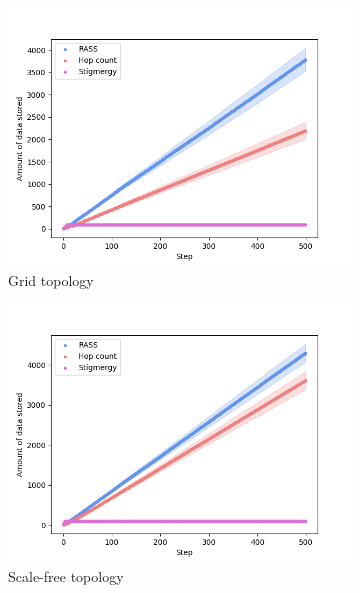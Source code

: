 \begin{figure}
    \centering
    \begin{subfigure}{0.48\textwidth}
        \includegraphics[width=\textwidth]{figures/dora_mesh/grid_storage.png}
        \caption{Grid topology}
        \label{results:grid_100_storage}
    \end{subfigure}
    \begin{subfigure}{0.48\textwidth}
        \includegraphics[width=\textwidth]{figures/dora_mesh/scale_storage.png}
        \caption{Scale-free topology}
        \label{results:scale_100_storage}
    \end{subfigure}
    \begin{subfigure}{0.48\textwidth}

\end{subfigure}
\end{figure}
